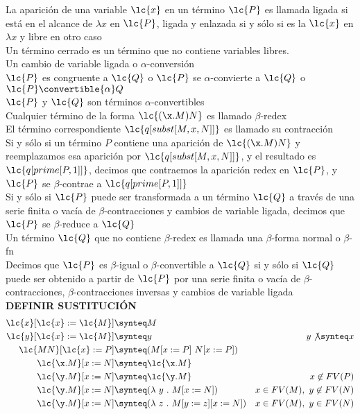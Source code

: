 La aparición de una variable \(\lc{x}\) en un término \(\lc{P}\) es llamada
ligada si está en el alcance de \(\lambda x\) en \(\lc{P}\), ligada y enlazada
si y sólo si es la \(\lc{x}\) en \(\lambda x\) y libre en otro caso \\

Un término cerrado es un término que no contiene variables libres. \\

Un cambio de variable ligada o \(\alpha\)-conversión \\

\(\lc{P}\) es congruente a \(\lc{Q}\) o \(\lc{P}\) se \(\alpha\)-convierte a
\(\lc{Q}\) o \(\lc{P} \convertible{\alpha} Q\) \\

\(\lc{P}\) y \(\lc{Q}\) son términos \(\alpha\)-convertibles \\

Cualquier término de la forma \(\lc{(\x.M)N}\) es llamado \(\beta\)-redex \\

El término correspondiente \(\lc{q[subst[M,x,N]]}\) es llamado su contracción \\

Si y sólo si un término \(P\) contiene una aparición de \(\lc{(\x.M)N}\) y
reemplazamos esa aparición por \(\lc{q[subst[M,x,N]]}\), y el resultado es
\(\lc{q[prime[P,1]]}\), decimos que contraemos la aparición redex en \(\lc{P}\),
y \(\lc{P}\) se \(\beta\)-contrae a \(\lc{q[prime[P,1]]}\) \\

Si y sólo si \(\lc{P}\) puede ser transformada a un término \(\lc{Q}\) a través
de una serie finita o vacía de \(\beta\)-contracciones y cambios de variable
ligada, decimos que \(\lc{P}\) se \(\beta\)-reduce a \(\lc{Q}\) \\

Un término \(\lc{Q}\) que no contiene \(\beta\)-redex es llamada una
\(\beta\)-forma normal o \(\beta\)-fn \\

Decimos que \(\lc{P}\) es \(\beta\)-igual o \(\beta\)-convertible a \(\lc{Q}\)
si y sólo si \(\lc{Q}\) puede ser obtenido a partir de \(\lc{P}\) por una serie
finita o vacía de \(\beta\)-contracciones, \(\beta\)-contracciones inversas y
cambios de variable ligada \\


\textbf{DEFINIR SUSTITUCIÓN}\\

\begin{align} 
  \lc{x}[\lc{x}:=\lc{M}] &\synteq M &\\
  \lc{y}[\lc{x}:=\lc{M}] &\synteq y &y \not\synteq x\\
  \lc{M N}[\lc{x}:=P] &\synteq (M[x:=P]\ N[x:=P]) &\\
  \lc{\x.M}[x:=N] &\synteq \lc{\x.M} &\\
  \lc{\y.M}[x:=N] &\synteq \lc{\y.M} &x \not\in FV(P)\\
  \lc{\y.M}[x:=N] &\synteq (\lambda\ y\ .\ M[x:=N]) &x\in FV(M),\ y\not\in FV(N)\\
  \lc{\y.M}[x:=N] &\synteq (\lambda\ z\ .\ M[y:=z][x:=N]) &x\in FV(M),\ y\in FV(N)
\end{align}

